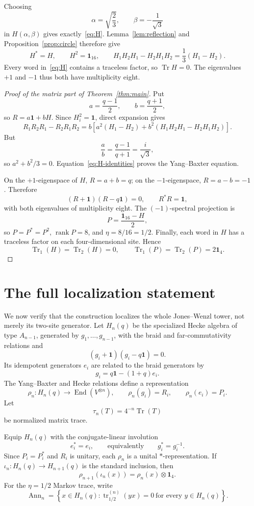 \documentclass[11pt]{article}
\theoremstyle{remark}
\newcommand{\Id}{\mathbf 1}
\newcommand{\Tr}{\operatorname{Tr}}
\newcommand{\End}{\operatorname{End}}
\newcommand{\rank}{\operatorname{rank}}
\begin{document}
Choosing
\[
  \alpha=\sqrt{\frac23},\qquad\beta=-\frac1{\sqrt3}
\]
in \(H(\alpha,\beta)\) gives exactly~\eqref{eq:H}.  Lemma~\ref{lem:reflection}
and Proposition~\ref{prop:circle} therefore give
\begin{equation}
  H^*=H,\qquad H^2=\Id_{16},\qquad
  H_1H_2H_1-H_2H_1H_2=\frac13(H_1-H_2).
  \label{eq:H-identities}
\end{equation}
Every word in~\eqref{eq:H} contains a traceless factor, so
\(\Tr H=0\).  The eigenvalues \(+1\) and \(-1\) thus both have multiplicity
eight.

\begin{proof}[Proof of the matrix part of Theorem~\ref{thm:main}]
Put
\[
  a=\frac{q-1}{2},\qquad b=\frac{q+1}{2},
\]
so \(R=a\Id+bH\).  Since \(H_i^2=\Id\), direct expansion gives
\[
  R_1R_2R_1-R_2R_1R_2
  =
  b\left[
    a^2(H_1-H_2)+b^2(H_1H_2H_1-H_2H_1H_2)
  \right].
\]
But
\[
  \frac ab=\frac{q-1}{q+1}=\frac{i}{\sqrt3},
\]
so \(a^2+b^2/3=0\).  Equation~\eqref{eq:H-identities} proves
the Yang--Baxter equation.

On the \(+1\)-eigenspace of \(H\), \(R=a+b=q\); on the
\(-1\)-eigenspace, \(R=a-b=-1\).  Therefore
\[
  (R+\Id)(R-q\Id)=0,\qquad R^*R=\Id,
\]
with both eigenvalues of multiplicity eight.  The \((-1)\)-spectral
projection is
\[
  P=\frac{\Id_{16}-H}{2},
\]
so \(P=P^*=P^2\), \(\rank P=8\), and \(\eta=8/16=1/2\).
Finally, each word in \(H\) has a traceless factor on each four-dimensional
site.  Hence
\[
  \Tr_1(H)=\Tr_2(H)=0,\qquad
  \Tr_1(P)=\Tr_2(P)=2\Id_4.
\]
\end{proof}

\section{The full localization statement}\label{sec:localization}

We now verify that the construction localizes the whole Jones--Wenzl tower,
not merely its two-site generator.  Let \(H_n(q)\) be the specialized Hecke
algebra of type \(A_{n-1}\), generated by \(g_1,\ldots,g_{n-1}\), with the braid and
far-commutativity relations and
\[
  (g_i+\Id)(g_i-q\Id)=0.
\]
Its idempotent generators \(e_i\) are related to the braid generators by
\[
  g_i=q\Id-(1+q)e_i.
\]
The Yang--Baxter and Hecke relations define a representation
\[
  \rho_n:H_n(q)\longrightarrow\End(V^{\otimes n}),\qquad
  \rho_n(g_i)=R_i,\qquad \rho_n(e_i)=P_i.
\]
Let
\[
  \tau_n(T)=4^{-n}\Tr(T)
\]
be normalized matrix trace.

Equip \(H_n(q)\) with the conjugate-linear involution
\[
  e_i^*=e_i,\qquad\text{equivalently}\qquad g_i^*=g_i^{-1}.
\]
Since \(P_i=P_i^*\) and \(R_i\) is unitary, each \(\rho_n\) is a unital
\(*\)-representation.  If
\(\iota_n:H_n(q)\to H_{n+1}(q)\) is the standard inclusion, then
\begin{equation}
  \rho_{n+1}(\iota_n(x))=\rho_n(x)\otimes\Id_4.
  \label{eq:tower-compatibility}
\end{equation}
For the \(\eta=1/2\) Markov trace, write
\[
  \operatorname{Ann}_n
  =
  \left\{x\in H_n(q):
  \operatorname{tr}^{(n)}_{1/2}(yx)=0\ \text{for every }y\in H_n(q)\right\}.
\]
\end{document}
